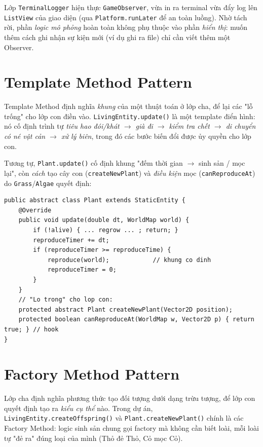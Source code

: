 \documentclass[12pt,a4paper]{report}
\newcommand{\code}[1]{\texttt{\small #1}}
\begin{document}
Lớp \code{TerminalLogger} hiện thực \code{GameObserver}, vừa in ra terminal vừa đẩy log lên \code{ListView} của giao diện (qua \code{Platform.runLater} để an toàn luồng). Nhờ tách rời, phần \textit{logic mô phỏng} hoàn toàn không phụ thuộc vào phần \textit{hiển thị}: muốn thêm cách ghi nhận sự kiện mới (ví dụ ghi ra file) chỉ cần viết thêm một Observer.

\section{Template Method Pattern}

Template Method định nghĩa \textit{khung} của một thuật toán ở lớp cha, để lại các "lỗ trống" cho lớp con điền vào. \code{LivingEntity.update()} là một template điển hình: nó cố định trình tự \textit{tiêu hao đói/khát $\to$ già đi $\to$ kiểm tra chết $\to$ di chuyển có né vật cản $\to$ xử lý biên}, trong đó các bước biến đổi được ủy quyền cho lớp con.

Tương tự, \code{Plant.update()} cố định khung "đếm thời gian $\to$ sinh sản / mọc lại", còn \emph{cách} tạo cây con (\code{createNewPlant}) và \emph{điều kiện} mọc (\code{canReproduceAt}) do \code{Grass}/\code{Algae} quyết định:

\begin{lstlisting}[caption={Template Method trong Plant}]
public abstract class Plant extends StaticEntity {
    @Override
    public void update(double dt, WorldMap world) {
        if (!alive) { ... regrow ... ; return; }
        reproduceTimer += dt;
        if (reproduceTimer >= reproduceTime) {
            reproduce(world);            // khung co dinh
            reproduceTimer = 0;
        }
    }
    // "Lo trong" cho lop con:
    protected abstract Plant createNewPlant(Vector2D position);
    protected boolean canReproduceAt(WorldMap w, Vector2D p) { return true; } // hook
}
\end{lstlisting}

\section{Factory Method Pattern}

Lớp cha định nghĩa phương thức tạo đối tượng dưới dạng trừu tượng, để lớp con quyết định tạo ra \textit{kiểu cụ thể} nào. Trong dự án, \code{LivingEntity.createOffspring()} và \code{Plant.createNewPlant()} chính là các Factory Method: logic sinh sản chung gọi factory mà không cần biết loài, mỗi loài tự "đẻ ra" đúng loại của mình (Thỏ đẻ Thỏ, Cỏ mọc Cỏ).
\end{document}
